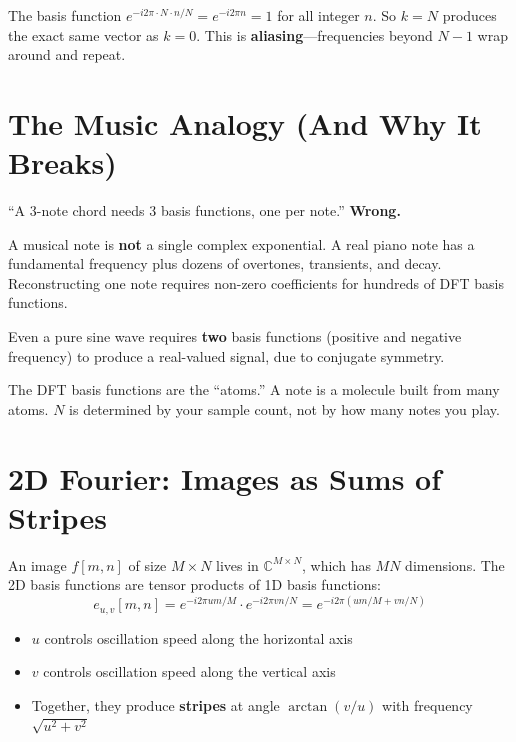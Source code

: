 \documentclass[11pt,a4paper]{article}
\theoremstyle{definition}
\begin{document}
The basis function $e^{-i2\pi \cdot N \cdot n/N} = e^{-i2\pi n} = 1$ for all integer $n$. So $k = N$ produces the exact same vector as $k = 0$. This is \textbf{aliasing}---frequencies beyond $N-1$ wrap around and repeat.

\section{The Music Analogy (And Why It Breaks)}

\begin{pitfall}
``A 3-note chord needs 3 basis functions, one per note.'' \textbf{Wrong.}

A musical note is \textbf{not} a single complex exponential. A real piano note has a fundamental frequency plus dozens of overtones, transients, and decay. Reconstructing one note requires non-zero coefficients for hundreds of DFT basis functions.

Even a pure sine wave requires \textbf{two} basis functions (positive and negative frequency) to produce a real-valued signal, due to conjugate symmetry.

The DFT basis functions are the ``atoms.'' A note is a molecule built from many atoms. $N$ is determined by your sample count, not by how many notes you play.
\end{pitfall}

\section{2D Fourier: Images as Sums of Stripes}

An image $f[m,n]$ of size $M \times N$ lives in $\mathbb{C}^{M \times N}$, which has $MN$ dimensions. The 2D basis functions are tensor products of 1D basis functions:
\begin{equation}
    e_{u,v}[m,n] = e^{-i2\pi um/M} \cdot e^{-i2\pi vn/N} = e^{-i2\pi(um/M + vn/N)}
\end{equation}

\begin{itemize}
    \item $u$ controls oscillation speed along the horizontal axis
    \item $v$ controls oscillation speed along the vertical axis
    \item Together, they produce \textbf{stripes} at angle $\arctan(v/u)$ with frequency $\sqrt{u^2 + v^2}$
\end{itemize}
\end{document}
